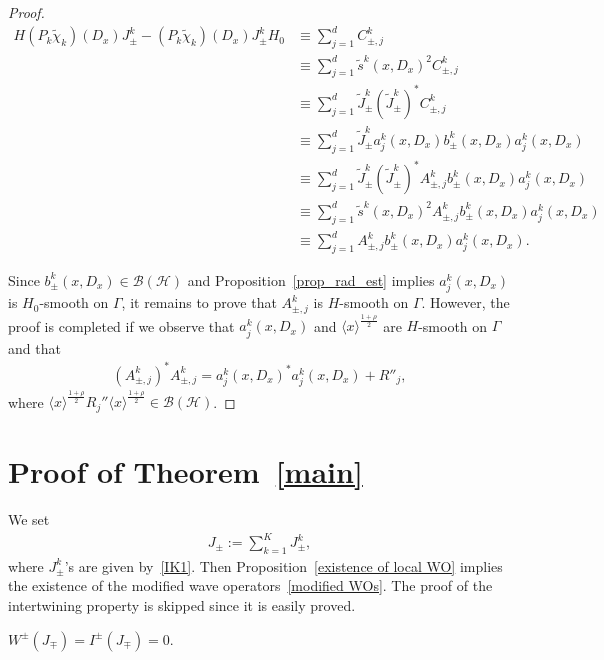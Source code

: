 \documentclass[AHL,Unicode,longabstracts,published]{cedram}
\newcommand{\HS}{\mathcal{H}}
\newcommand{\BS}{\mathcal{B}}
\newcommand{\jap}[1]{\langle #1 \rangle}
\newcommand{\HS}{\mathcal{H}}
\begin{document}
\begin{proof}
\begin{align*}
H (P_k \tilde\chi_k)(D_x)J_\pm^k - (P_k \tilde\chi_k)(D_x)J_\pm^k H_0 
&\equiv \sum_{j=1}^d C_{\pm,j}^k \\
&\equiv \sum_{j=1}^d \tilde s^k(x,D_x)^2 C_{\pm,j}^k \\
&\equiv \sum_{j=1}^d \tilde J_\pm^k (\tilde J_\pm^k)^* C_{\pm,j}^k \\
&\equiv \sum_{j=1}^d \tilde J_\pm^k a_j^k(x,D_x) b_\pm^k(x,D_x) a_j^k(x,D_x) \\
&\equiv \sum_{j=1}^d \tilde J_\pm^k (\tilde J_\pm^k)^* A_{\pm,j}^k b_\pm^k(x,D_x) a_j^k(x,D_x) \\
&\equiv \sum_{j=1}^d \tilde s^k(x,D_x)^2 A_{\pm,j}^k b_\pm^k(x,D_x) a_j^k(x,D_x) \\
&\equiv \sum_{j=1}^d A_{\pm,j}^k b_\pm^k(x,D_x) a_j^k(x,D_x).
\end{align*}

Since $b_\pm^k(x,D_x) \in \BS(\HS)$ and Proposition~\ref{prop_rad_est} implies $a_j^k(x,D_x)$ is $H_0$-smooth on $\Gamma$, it remains to prove that $A_{\pm,j}^k$ is $H$-smooth on $\Gamma$. However, the proof is completed if we observe that $a_j^k(x,D_x)$ and $\jap{x}^{\frac{1+\rho}{2}}$ are $H$-smooth on $\Gamma$ and that
\begin{align*}
\left(A_{\pm,j}^k\right)^* A_{\pm,j}^k=a_j^k(x,D_x)^*a_j^k(x,D_x) + R''_j,
\end{align*}
where $\jap{x}^{\frac{1+\rho}{2}}R_j''\jap{x}^{\frac{1+\rho}{2}}\in\BS(\HS)$.
\end{proof}



\section{Proof of Theorem~\ref{main}} \label{proof section}


We set
\begin{align}\label{time-independent modifiers}
J_\pm := \sum_{k=1}^K J_\pm^k,
\end{align}
where $J_\pm^k$'s are given by~\eqref{IK1}. Then Proposition~\ref{existence of local WO} implies the existence of the modified wave operators~\eqref{modified WOs}. The proof of the intertwining property is skipped since it is easily proved.



\begin{prop}\label{nonstationary prop}
$W^\pm(J_\mp) = I^\pm(J_\mp) = 0$.
\end{prop}
\end{document}
